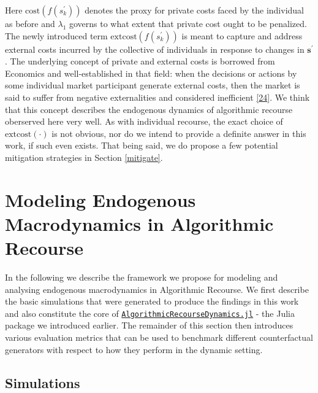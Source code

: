\documentclass[conference,final,]{IEEEtran}
\theoremstyle{definition}
\theoremstyle{definition}
\theoremstyle{definition}
\theoremstyle{definition}
\theoremstyle{remark}
\begin{document}
Here \(\text{cost}(f(s_k^\prime))\) denotes the proxy for private costs faced by the individual as before and \(\lambda_1\) governs to what extent that private cost ought to be penalized. The newly introduced term \(\text{extcost}(f(s_k^\prime))\) is meant to capture and address external costs incurred by the collective of individuals in response to changes in \(\mathbf{s}^\prime\). The underlying concept of private and external costs is borrowed from Economics and well-established in that field: when the decisions or actions by some individual market participant generate external costs, then the market is said to suffer from negative externalities and considered inefficient \protect\hyperlink{ref-pindyck2014microeconomics}{{[}24{]}}. We think that this concept describes the endogenous dynamics of algorithmic recourse oberserved here very well. As with individual recourse, the exact choice of \(\text{extcost}(\cdot)\) is not obvious, nor do we intend to provide a definite answer in this work, if such even exists. That being said, we do propose a few potential mitigation strategies in Section \ref{mitigate}.

\hypertarget{method-2}{%
\section{Modeling Endogenous Macrodynamics in Algorithmic Recourse}\label{method-2}}

In the following we describe the framework we propose for modeling and analysing endogenous macrodynamics in Algorithmic Recourse. We first describe the basic simulations that were generated to produce the findings in this work and also constitute the core of \href{https://anonymous.4open.science/r/AlgorithmicRecourseDynamics/README.md}{\texttt{AlgorithmicRecourseDynamics.jl}} - the Julia package we introduced earlier. The remainder of this section then introduces various evaluation metrics that can be used to benchmark different counterfactual generators with respect to how they perform in the dynamic setting.

\hypertarget{method-2-experiment}{%
\subsection{Simulations}\label{method-2-experiment}}
\end{document}
